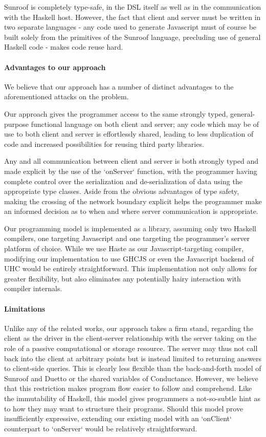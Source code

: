 \documentclass[preprint]{sigplanconf}
\begin{document}
Sunroof is completely type-safe, in the DSL itself as well as in the
communication with the Haskell host. However, the fact that client and server
must be written in two separate languages - any code used to generate
Javascript must of course be built solely from the primitives of the Sunroof
language, precluding use of general Haskell code - makes code reuse hard.

\paragraph{Advantages to our approach} We believe that our approach has a
number of distinct advantages to the aforementioned attacks on the problem.

Our approach gives the programmer access to the same strongly typed,
general-purpose functional language on both client and server; any code which
may be of use to both client and server is effortlessly shared, leading to less
duplication of code and increased possibilities for reusing third party
libraries.

Any and all communication between client and server is both strongly typed
and made explicit by the use of the `onServer` function, with the programmer
having complete control over the serialization and de-serialization of data
using the appropriate type classes. Aside from the obvious advantages of type
safety, making the crossing of the network boundary explicit helps the
programmer make an informed decision as to when and where server communication
is appropriate.

Our programming model is implemented as a library, assuming only two Haskell
compilers, one targeting Javascript and one targeting the programmer's server
platform of choice. While we use Haste as our Javascript-targeting compiler,
modifying our implementation to use GHCJS or even the Javascript backend of UHC
would be entirely straightforward. This implementation not only allows for
greater flexibility, but also eliminates any potentially hairy interaction with
compiler internals.

\paragraph{Limitations} Unlike any of the related works, our approach takes a
firm stand, regarding the client as the driver in the client-server
relationship with the server taking on the role of a passive computational
or storage resource. The server may thus not call back into the client at
arbitrary points but is instead limited to returning answers to client-side
queries. This is clearly less flexible than the back-and-forth model of Sunroof
and Duetto or the shared variables of Conductance. However, we believe that
this restriction makes program flow easier to follow and comprehend. Like the
immutability of Haskell, this model gives programmers a not-so-subtle hint
as to how they may want to structure their programs. Should this model prove
insufficiently expressive, extending our existing model with an `onClient`
counterpart to `onServer` would be relatively straightforward.
\end{document}
